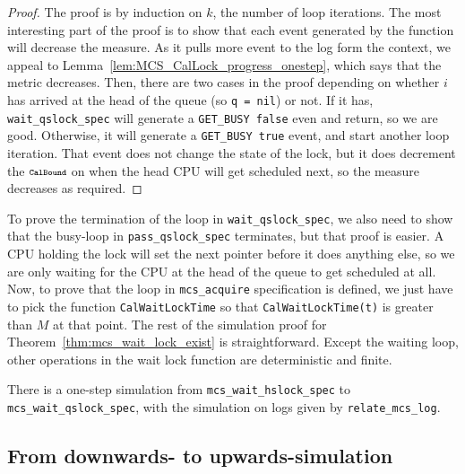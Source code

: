 \begin{proof}
The proof is by induction on $k$, the number of loop iterations. The
most interesting part of the proof is to show that each event
generated by the function will decrease the measure.
As it pulls more event to the log form the context, we appeal to
Lemma~\ref{lem:MCS_CalLock_progress_onestep}, which says that the metric decreases. 
Then, there are two cases in the proof depending on whether $i$ has
arrived at the head of the queue (so \lstinline$q = nil$) or not. If it has,
\lstinline$wait_qslock_spec$ will generate a \lstinline$GET_BUSY false$
even and return, so we are good. 
Otherwise, it will generate a \lstinline$GET_BUSY true$ event, and
start another loop iteration. That event does not change the state of
the lock, but it does decrement the $\CalBound$ on when the head CPU
will get scheduled next, so the measure decreases as required.
\end{proof}

To prove the termination of the loop in \lstinline$wait_qslock_spec$, 
we also need to show that the busy-loop in \lstinline$pass_qslock_spec$ terminates, 
but that proof is easier. A CPU holding the lock will set
the next pointer before it does anything else, so we are only waiting
for the CPU at the head of the queue to get scheduled at all.
Now, to prove that the loop in \lstinline$mcs_acquire$ specification
is defined, we just have to pick the function \lstinline$CalWaitLockTime$
so that \lstinline$CalWaitLockTime(t)$ is greater than $M$ at that
point. The rest of the simulation proof for Theorem~\ref{thm:mcs_wait_lock_exist} is straightforward.
Except the waiting loop, other operations in the wait lock function are deterministic and finite. 


\begin{theorem}
There is a one-step simulation from \lstinline$mcs_wait_hslock_spec$ to
\lstinline$mcs_wait_qslock_spec$, with the simulation on logs given by \lstinline$relate_mcs_log$.
\end{theorem}


\subsection{From downwards- to upwards-simulation}
\label{sec:downwards-to-upwards}

